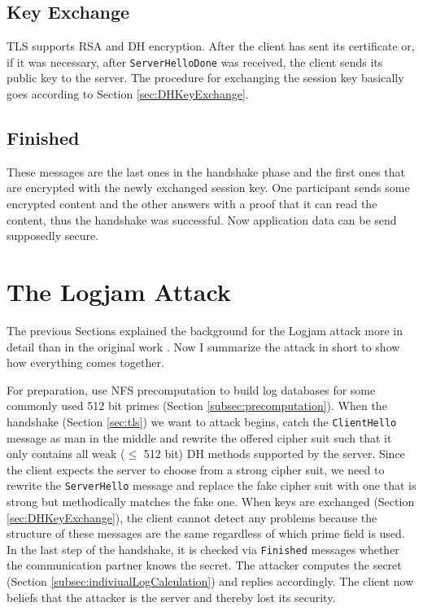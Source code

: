 \documentclass[paper=a4, fontsize=11pt]{scrartcl} %
\numberwithin{equation}{section} %
\numberwithin{figure}{section} %
\numberwithin{table}{section} %
\begin{document}
\subsection{Key Exchange}
TLS supports RSA and DH encryption. After the client has sent its certificate or, if it was necessary, after \verb|ServerHelloDone| was received, the client sends its public key to the server. The procedure for exchanging the session key basically goes according to Section \ref{sec:DHKeyExchange}.

\subsection{Finished}
These messages are the last ones in the handshake phase and the first ones that are encrypted with the newly exchanged session key. One participant sends some encrypted content and the other answers with a proof that it can read the content, thus the handshake was successful. Now application data can be send supposedly secure.

\section{The Logjam Attack}
The previous Sections explained the background for the Logjam attack more in detail than in the original work \citep{Adrian:2015:IFS:2810103.2813707}. Now I summarize the attack in short to show how everything comes together.

For preparation, use NFS precomputation to build log databases for some commonly used 512 bit primes (Section \ref{subsec:precomputation}). When the handshake (Section \ref{sec:tls}) we want to attack begins, catch the \verb|ClientHello| message as man in the middle and rewrite the offered cipher suit such that it only contains all weak ($\leq$ 512 bit) DH methods supported by the server. Since the client expects the server to choose from a strong cipher suit, we need to rewrite the \verb|ServerHello| message and replace the fake cipher suit with one that is strong but methodically matches the fake one. When keys are exchanged (Section \ref{sec:DHKeyExchange}), the client cannot detect any problems because the structure of these messages are the same regardless of which prime field is used. In the last step of the handshake, it is checked via \verb|Finished| messages whether the communication partner knows the secret. The attacker computes the secret (Section \ref{subsec:indiviualLogCalculation}) and replies accordingly. The client now beliefs that the attacker is the server and thereby lost its security.
\end{document}

